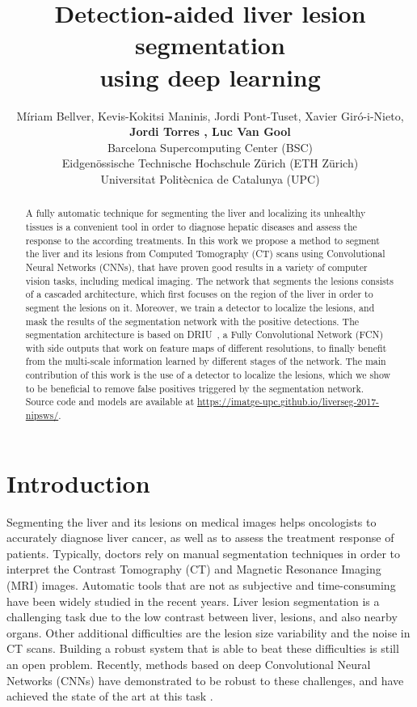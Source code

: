 \documentclass{article}
\title{Detection-aided liver lesion segmentation \\using deep learning}
\author{
 M\'{i}riam Bellver\raisebox{5pt}{\small \dag}, Kevis-Kokitsi Maninis\raisebox{5pt}{\small \ddag}, Jordi Pont-Tuset\raisebox{5pt}{\small \ddag}, Xavier Gir{\'o}-i-Nieto\raisebox{5pt}{\small \S}, \\
  \textbf{Jordi Torres \raisebox{5pt}{\small \dag,\S}, Luc Van Gool \raisebox{5pt}{\small \ddag} }\\
  \raisebox{5pt}{\small \dag}Barcelona Supercomputing Center (BSC) \\
  \raisebox{5pt}{\small \ddag} Eidgen\"{o}ssische Technische Hochschule Z\"{u}rich (ETH Z\"{u}rich) \\
  \raisebox{5pt}{\small \S}Universitat Polit{\`e}cnica de Catalunya (UPC) \\
}
\begin{document}

\maketitle

\begin{abstract}
  A fully automatic technique for segmenting the liver and localizing its unhealthy tissues is a convenient tool in order to diagnose hepatic diseases and assess the response to the according treatments. In this work we propose a method to segment the liver and its lesions from Computed Tomography (CT) scans using Convolutional Neural Networks (CNNs), that have proven good results in a variety of computer vision tasks, including medical imaging. The network that segments the lesions consists of a cascaded architecture, which first focuses on the region of the liver in order to segment the lesions on it. Moreover, we train a detector to localize the lesions, and mask the results of the segmentation network with the positive detections. The segmentation architecture is based on DRIU~\cite{maninis2016deep}, a Fully Convolutional Network (FCN) with side outputs that work on feature maps of different resolutions, to finally  benefit from the multi-scale information learned by different stages of the network. The main contribution of this work is the use of a detector to localize the lesions, which we show to be beneficial to remove false positives triggered by the segmentation network. Source code and models are available
at \url{https://imatge-upc.github.io/liverseg-2017-nipsws/}.
\end{abstract}

\section{Introduction}

Segmenting the liver and its lesions on medical images helps oncologists to accurately diagnose liver cancer, as well as to assess the treatment response of patients. Typically, doctors rely on manual segmentation techniques in order to interpret the Contrast Tomography (CT) and Magnetic Resonance Imaging (MRI) images. Automatic tools that are not as subjective and time-consuming have been widely studied in the recent years. Liver lesion segmentation is a challenging task due to the low contrast between liver, lesions, and also nearby organs. Other additional difficulties are the lesion size variability and the noise in CT scans. Building a robust system that is able to beat these difficulties is still an open problem. Recently, methods based on deep Convolutional Neural Networks (CNNs) have demonstrated to be robust to these challenges, and have achieved the state of the art at this task \cite{christ2017automatic, han2017automatic, bi2017automatic}. 
\end{document}
